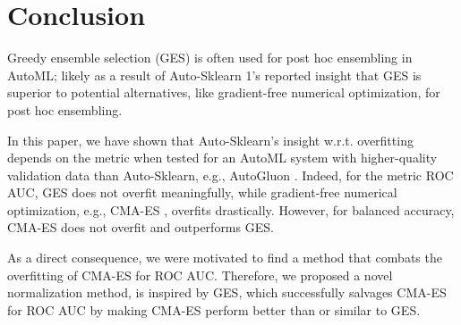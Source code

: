 \documentclass[11pt]{article}
\newcommand{\nbc}[3]{
		{\colorbox{#3}{\bfseries\sffamily\scriptsize\textcolor{white}{#1}}}
		{\textcolor{#3}{\sf\small$\blacktriangleright$\textit{#2}$\blacktriangleleft$}}
}
\newcommand{\changed}[1]{\nbc{CHANGED}{#1}{changedcolor}}
\renewcommand{\changed}[1]{{\color{changedcolor}#1}}
\renewcommand{\changed}[1]{{#1}}
\begin{document}
\begin{table}[h]
\caption{Mean rank change for CMA-ES-ExplictGES compared to GES and SingleBest. \changed{In the case of a tie for the absolute rank, we assign all tied values the average of their tie-broken ranks.}}\label{table/rank_change_2}
\centering
{}
\end{table}

\section{Conclusion}
Greedy ensemble selection (GES) \citep{caruana2004} is often used for post hoc ensembling in AutoML; likely as a result of Auto-Sklearn 1's \citep{ask1} reported insight that GES is superior to potential alternatives, like gradient-free numerical optimization, for post hoc ensembling.

In this paper, we have shown that Auto-Sklearn's insight w.r.t.{} overfitting depends on the metric when tested for an AutoML system with higher-quality validation data than Auto-Sklearn, e.g., AutoGluon \citep{ag1}.   
Indeed, for the metric ROC AUC, GES does not overfit meaningfully, while gradient-free numerical optimization, e.g., CMA-ES \citep{cma/Hansen14, cma/HansenTutorial2016}, overfits drastically. 
However, for balanced accuracy, CMA-ES does not overfit and outperforms GES.

As a direct consequence, we were motivated to find a method that combats the overfitting of CMA-ES for ROC AUC.
Therefore, we proposed a novel normalization method, is inspired by GES, which successfully salvages CMA-ES for ROC AUC by making CMA-ES perform better than or similar to GES. 
\end{document}
